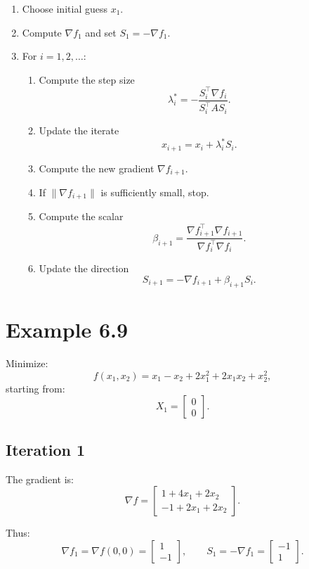 \documentclass[9pt,a4paper]{extarticle}
\begin{document}
\begin{enumerate}
    \item Choose initial guess $x_1$.
    \item Compute $\nabla f_1$ and set $S_1 = -\nabla f_1$.
    \item For $i = 1, 2, \dots$:
    \begin{enumerate}
        \item Compute the step size
        \[
        \lambda_i^* = -\frac{S_i^\top \nabla f_i}{S_i^\top A S_i}.
        \]
        \item Update the iterate
        \[
        x_{i+1} = x_i + \lambda_i^* S_i.
        \]
        \item Compute the new gradient $\nabla f_{i+1}$.
        \item If $\|\nabla f_{i+1}\|$ is sufficiently small, stop.
        \item Compute the scalar
        \[
        \beta_{i+1} = \frac{\nabla f_{i+1}^\top \nabla f_{i+1}}{\nabla f_i^\top \nabla f_i}.
        \]
        \item Update the direction
        \[
        S_{i+1} = -\nabla f_{i+1} + \beta_{i+1} S_i.
        \]
    \end{enumerate}
\end{enumerate}

\section{Example 6.9}

Minimize:
\[
f(x_1, x_2) = x_1 - x_2 + 2x_1^2 + 2x_1 x_2 + x_2^2,
\]
starting from:
\[
X_1 =
\begin{bmatrix}
0\\
0
\end{bmatrix}.
\]

\subsection*{Iteration 1}

The gradient is:
\[
\nabla f =
\begin{bmatrix}
1 + 4x_1 + 2x_2 \\
-1 + 2x_1 + 2x_2
\end{bmatrix}.
\]

Thus:
\[
\nabla f_1 = \nabla f(0,0) =
\begin{bmatrix}
1\\
-1
\end{bmatrix},
\qquad
S_1 = -\nabla f_1 =
\begin{bmatrix}
-1\\
1
\end{bmatrix}.
\]
\end{document}
